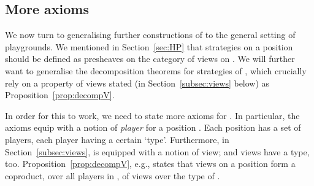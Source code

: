 \documentclass{LMCS}
\theoremstyle{plain}\newtheorem{satz}[thm]{Satz}
\begin{document}
\subsection{More axioms}
We now turn to generalising further constructions
of  to the general setting of
playgrounds.  We mentioned in Section~\ref{sec:HP} that strategies on
a position  should be defined as presheaves on the category of
views on .  We will further want to generalise the decomposition
theorems for strategies of , which
crucially rely on a property of views stated (in
Section~\ref{subsec:views} below) as Proposition~\ref{prop:decompV}.

In order for this to work, we need to state more axioms for .  In
particular, the axioms equip  with a notion of \emph{player} for a
position .  Each position has a set of players, each player having
a certain `type'.  Furthermore, in Section~\ref{subsec:views},  is
equipped with a notion of view; and views have a type, too.
Proposition~\ref{prop:decompV}, e.g., states that views on a position
 form a coproduct, over all players  in , of views over the
type of .
\end{document}
